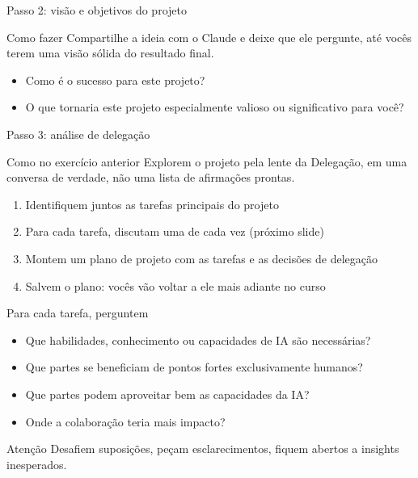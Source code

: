 \documentclass[aspectratio=169,11pt]{beamer}
\begin{document}
\begin{frame}{Passo 2: visão e objetivos do projeto}
  \begin{notebox}{Como fazer}
    \small Compartilhe a ideia com o Claude e deixe que ele pergunte, até vocês terem uma visão sólida do resultado final.
  \end{notebox}
  \vspace{0.3cm}
  \begin{itemize}
    \item Como é o sucesso para este projeto?
    \item O que tornaria este projeto especialmente valioso ou significativo para você?
  \end{itemize}
\end{frame}

\begin{frame}{Passo 3: análise de delegação}
  \begin{notebox}{Como no exercício anterior}
    \small Explorem o projeto pela lente da Delegação, em uma conversa de verdade, não uma lista de afirmações prontas.
  \end{notebox}
  \vspace{0.3cm}
  \begin{enumerate}
    \item Identifiquem juntos as tarefas principais do projeto
    \item Para cada tarefa, discutam uma de cada vez (próximo slide)
    \item Montem um plano de projeto com as tarefas e as decisões de delegação
    \item Salvem o plano: vocês vão voltar a ele mais adiante no curso
  \end{enumerate}
\end{frame}

\begin{frame}{Para cada tarefa, perguntem}
  \begin{itemize}
    \item Que habilidades, conhecimento ou capacidades de IA são necessárias?
    \item Que partes se beneficiam de pontos fortes exclusivamente humanos?
    \item Que partes podem aproveitar bem as capacidades da IA?
    \item Onde a colaboração teria mais impacto?
  \end{itemize}
  \vspace{0.3cm}
  \begin{alertbox}{Atenção}
    \small Desafiem suposições, peçam esclarecimentos, fiquem abertos a insights inesperados.
  \end{alertbox}
\end{frame}
\end{document}

